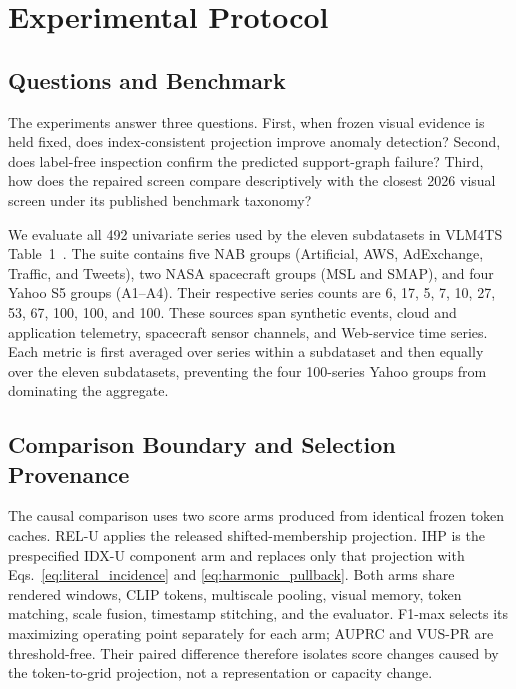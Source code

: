 \section{Experimental Protocol}
\label{sec:experiments}

\subsection{Questions and Benchmark}

The experiments answer three questions. First, when frozen visual evidence is
held fixed, does index-consistent projection improve anomaly detection?
Second, does label-free inspection confirm the predicted support-graph
failure? Third, how does the repaired screen compare descriptively with the
closest 2026 visual screen under its published benchmark taxonomy?

We evaluate all 492 univariate series used by the eleven subdatasets in
VLM4TS Table~1~\cite{he2026vlm4ts}. The suite contains five NAB groups
(Artificial, AWS, AdExchange, Traffic, and Tweets), two NASA spacecraft
groups (MSL and SMAP), and four Yahoo S5 groups (A1--A4). Their respective
series counts are 6, 17, 5, 7, 10, 27, 53, 67, 100, 100, and 100. These
sources span synthetic events, cloud and application telemetry, spacecraft
sensor channels, and Web-service time series. Each metric is first averaged
over series within a subdataset and then equally over the eleven subdatasets,
preventing the four 100-series Yahoo groups from dominating the aggregate.

\subsection{Comparison Boundary and Selection Provenance}

The causal comparison uses two score arms produced from identical frozen
token caches. \textsc{REL-U} applies the released shifted-membership
projection. \textsc{IHP} is the prespecified \textsc{IDX-U} component arm and
replaces only that projection with Eqs.~\eqref{eq:literal_incidence} and
\eqref{eq:harmonic_pullback}. Both arms share rendered windows, CLIP tokens,
multiscale pooling, visual memory, token matching, scale fusion, timestamp
stitching, and the evaluator. F1-max selects its maximizing operating point
separately for each arm; AUPRC and VUS-PR are threshold-free. Their paired
difference therefore isolates score changes caused by the token-to-grid
projection, not a representation or capacity change.

